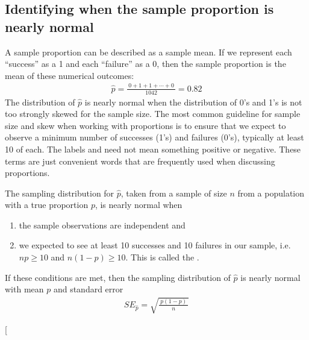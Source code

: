 \subsection{Identifying when the sample proportion is nearly normal}

A sample proportion can be described as a sample mean. If we represent each ``success'' as a 1 and each ``failure'' as a 0, then the sample proportion is the mean of these numerical outcomes:
\begin{eqnarray*}
\hat{p} = \frac{\ 0 + 1 + 1 + \cdots + 0\ }{1042} = 0.82
\end{eqnarray*}
The distribution of $\hat{p}$ is nearly normal when the distribution of 0's and 1's is not too strongly skewed for the sample size. The most common guideline for sample size and skew when working with proportions is to ensure that we expect to observe a minimum number of successes (1's) and failures (0's), typically at least 10 of each. The labels  and  need not mean something positive or negative. These terms are just convenient words that are frequently used when discussing proportions.

\begin{termBox}{
The sampling distribution for $\hat{p}$, taken from a sample of size $n$ from a population with a true proportion $p$, is nearly normal when
\begin{enumerate}
\item the sample observations are independent and
\item we expected to see at least 10 successes and 10 failures in our sample, i.e. $np\geq10$ and $n(1-p)\geq10$. This is called the .
\end{enumerate}
If these conditions are met, then the sampling distribution of $\hat{p}$ is nearly normal with mean $p$ and standard error
\begin{eqnarray}
SE_{\hat{p}} = \sqrt{\frac{\ p(1-p)\ }{n}}
\label{seOfPHat}
\end{eqnarray}}
\end{termBox}\marginpar[\raggedright\vspace{-53mm}


